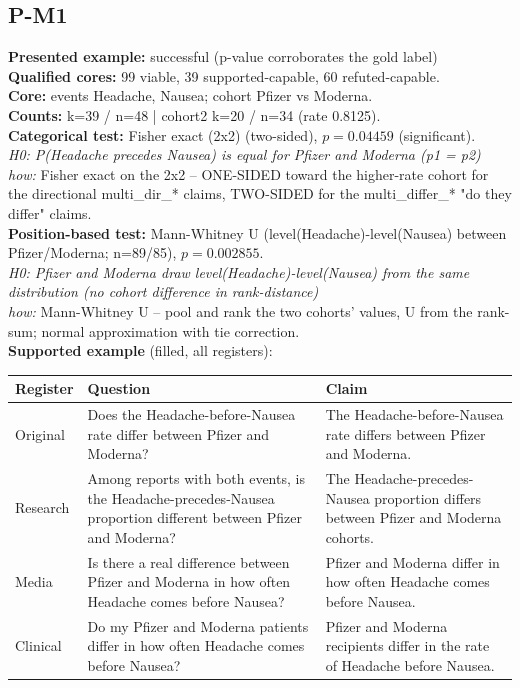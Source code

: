 \documentclass[11pt]{article}
\begin{document}
\subsection*{P-M1}
\textbf{Presented example:} successful (p-value corroborates the gold label) \\
\textbf{Qualified cores:} 99 viable, 39 supported-capable, 60 refuted-capable. \\
\textbf{Core:} events Headache, Nausea; cohort Pfizer vs Moderna. \\
\textbf{Counts:} k=39 / n=48  |  cohort2 k=20 / n=34  (rate 0.8125). \\
\textbf{Categorical test:} Fisher exact (2x2) (two-sided), $p = 0.04459$ (significant). \\
\emph{H0: P(Headache precedes Nausea) is equal for Pfizer and Moderna (p1 = p2)} \\
\emph{how:} Fisher exact on the 2x2 -- ONE-SIDED toward the higher-rate cohort for the directional multi\_dir\_* claims, TWO-SIDED for the multi\_differ\_* "do they differ" claims. \\
\textbf{Position-based test:} Mann-Whitney U (level(Headache)-level(Nausea) between Pfizer/Moderna; n=89/85), $p = 0.002855$. \\
\emph{H0: Pfizer and Moderna draw level(Headache)-level(Nausea) from the same distribution (no cohort difference in rank-distance)} \\
\emph{how:} Mann-Whitney U -- pool and rank the two cohorts' values, U from the rank-sum; normal approximation with tie correction. \\
\textbf{Supported example} (filled, all registers): \\
\begin{tabularx}{\linewidth}{@{}l L L@{}}
\toprule
\textbf{Register} & \textbf{Question} & \textbf{Claim} \\
\midrule
Original & Does the Headache-before-Nausea rate differ between Pfizer and Moderna? & The Headache-before-Nausea rate differs between Pfizer and Moderna. \\
Research & Among reports with both events, is the Headache-precedes-Nausea proportion different between Pfizer and Moderna? & The Headache-precedes-Nausea proportion differs between Pfizer and Moderna cohorts. \\
Media & Is there a real difference between Pfizer and Moderna in how often Headache comes before Nausea? & Pfizer and Moderna differ in how often Headache comes before Nausea. \\
Clinical & Do my Pfizer and Moderna patients differ in how often Headache comes before Nausea? & Pfizer and Moderna recipients differ in the rate of Headache before Nausea. \\
\bottomrule
\end{tabularx}
\vspace{3pt}
\end{document}
